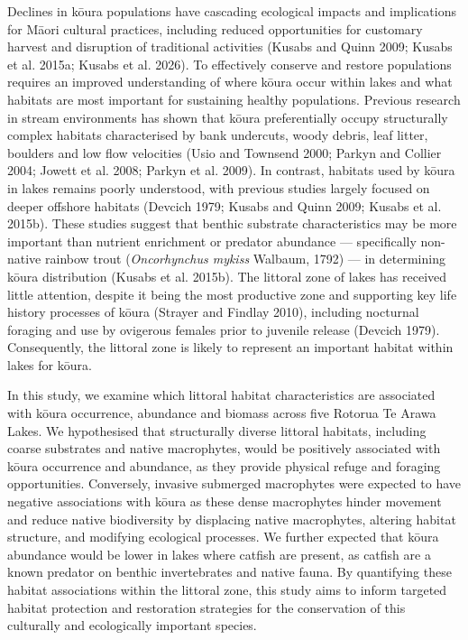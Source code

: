\documentclass[
  12pt,
  a4paper,
]{scrbook}
\begin{document}
Declines in kōura populations have cascading ecological impacts and
implications for Māori cultural practices, including reduced
opportunities for customary harvest and disruption of traditional
activities (Kusabs and Quinn 2009; Kusabs et al. 2015a; Kusabs et al.
2026). To effectively conserve and restore populations requires an
improved understanding of where kōura occur within lakes and what
habitats are most important for sustaining healthy populations. Previous
research in stream environments has shown that kōura preferentially
occupy structurally complex habitats characterised by bank undercuts,
woody debris, leaf litter, boulders and low flow velocities (Usio and
Townsend 2000; Parkyn and Collier 2004; Jowett et al. 2008; Parkyn et
al. 2009). In contrast, habitats used by kōura in lakes remains poorly
understood, with previous studies largely focused on deeper offshore
habitats (Devcich 1979; Kusabs and Quinn 2009; Kusabs et al. 2015b).
These studies suggest that benthic substrate characteristics may be more
important than nutrient enrichment or predator abundance ---
specifically non-native rainbow trout (\emph{Oncorhynchus mykiss}
Walbaum, 1792) --- in determining kōura distribution (Kusabs et al.
2015b). The littoral zone of lakes has received little attention,
despite it being the most productive zone and supporting key life
history processes of kōura (Strayer and Findlay 2010), including
nocturnal foraging and use by ovigerous females prior to juvenile
release (Devcich 1979). Consequently, the littoral zone is likely to
represent an important habitat within lakes for kōura.

In this study, we examine which littoral habitat characteristics are
associated with kōura occurrence, abundance and biomass across five
Rotorua Te Arawa Lakes. We hypothesised that structurally diverse
littoral habitats, including coarse substrates and native macrophytes,
would be positively associated with kōura occurrence and abundance, as
they provide physical refuge and foraging opportunities. Conversely,
invasive submerged macrophytes were expected to have negative
associations with kōura as these dense macrophytes hinder movement and
reduce native biodiversity by displacing native macrophytes, altering
habitat structure, and modifying ecological processes. We further
expected that kōura abundance would be lower in lakes where catfish are
present, as catfish are a known predator on benthic invertebrates and
native fauna. By quantifying these habitat associations within the
littoral zone, this study aims to inform targeted habitat protection and
restoration strategies for the conservation of this culturally and
ecologically important species.
\end{document}

